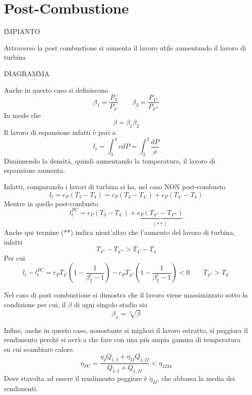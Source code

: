 \section{Post-Combustione}
\begin{adjustwidth}{2in}{}
	
	IMPIANTO 
	
	Attraverso la post combustione si aumenta il lavoro utile aumentando il lavoro di turbina
	
	DIAGRAMMA 
	
	Anche in questo caso si definiscono
	\[\beta_1 = \dfrac{P_{3}}{P_{4'}}\qquad \beta_2 = \dfrac{P_{4''}}{P_{4'''}}\]
	In modo che 
	\[\beta = \beta_1\beta_2\]
	Il lavoro di espansione infatti è pari a
	\[l_c = \int_{3}^{4}vdP = \int_{3}^{3}\dfrac{dP}{\rho}\]
	Diminuendo la densità, quindi aumentando la temperatura, il lavoro di espansione aumenta. \newline 
	
	Infatti, comparando i lavori di turbina si ha, nel caso NON post-combusto
	\[l_t = c_P(T_3-T_4) = c_P(T_3-T_{4'}) + c_P(T_{4'}-T_4)\]
	Mentre in quello post-combusto
	\[l_t^{PC} = c_P(T_3-T_{4'}) + \underbrace{c_P(T_{4''}-T_{4'''})}_{(**)}\]
	Anche qui termine (**) indica nient'altro che l'aumento del lavoro di turbina, infatti
	\[T_{4''}-T_{4'''}>T_{4'}-T_4\]
	Per cui
	\[l_t - l_t^{PC} = c_PT_{4'}\left(1-\dfrac{1}{\beta_2^\varepsilon-1}\right) - c_PT_{4''}\left(1-\dfrac{1}{\beta_2^\varepsilon-1}\right)<0 \qquad T_{4''} > T_{4'}\]
	
	Nel caso di post combustione si dimostra che il lavoro viene massimizzato sotto la condizione per cui, il $\beta$ di ogni singolo stadio sia 
	\[\beta_n = \sqrt[n]{\beta}\]
	
	Infine, anche in questo caso, nonostante si migliori il lavoro estratto, si peggiora il rendimento perché si avrà a che fare con una più ampia gamma di temperatura su cui scambiare calore.
	\[\eta_{PC} = \dfrac{\eta_IQ_{1,I} + \eta_{II}Q_{1,II}}{Q_{1,I} + Q_{1,II}}<\eta_{1234}\]
	Dove stavolta ad essere il rendimento peggiore è $\eta_{II}$, che abbassa la media dei rendimenti. 
	
\end{adjustwidth}

\newpage

